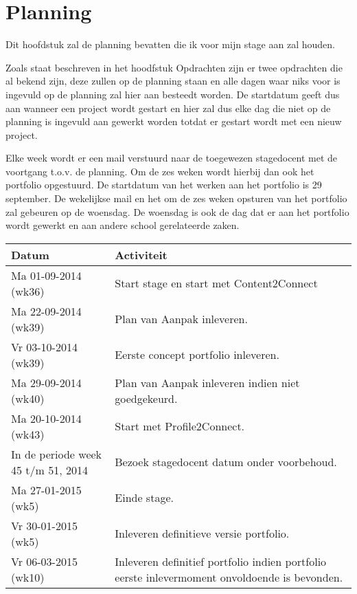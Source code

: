 \section{Planning}
Dit hoofdstuk zal de planning bevatten die ik voor mijn stage aan zal houden.

Zoals staat beschreven in het hoodfstuk Opdrachten zijn er twee opdrachten die al bekend zijn, deze zullen op de planning staan en alle dagen waar niks voor is ingevuld op de planning zal hier aan besteedt worden. De startdatum geeft dus aan wanneer een project wordt gestart en hier zal dus elke dag die niet op de planning is ingevuld aan gewerkt worden totdat er gestart wordt met een nieuw project.

Elke week wordt er een mail verstuurd naar de toegewezen stagedocent met de voortgang t.o.v. de planning. Om de zes weken wordt hierbij dan ook het portfolio opgestuurd. De startdatum van het werken aan het portfolio is 29 september. De wekelijkse mail en het om de zes weken opsturen van het portfolio zal gebeuren op de woensdag. De woensdag is ook de dag dat er aan het portfolio wordt gewerkt en aan andere school gerelateerde zaken.
\begin{tabu} to \textwidth { | X[l] | X[l] | }
\hline
Datum & Activiteit \\ \hline
Ma 01-09-2014 (wk36) & Start stage en start met Content2Connect \\
Ma 22-09-2014 (wk39) & Plan van Aanpak inleveren. \\
Vr 03-10-2014 (wk39) & Eerste concept portfolio inleveren. \\
Ma 29-09-2014 (wk40) & Plan van Aanpak inleveren indien niet goedgekeurd. \\
Ma 20-10-2014 (wk43) & Start met Profile2Connect. \\
In de periode week 45 t/m 51, 2014 & Bezoek stagedocent datum onder voorbehoud. \\
Ma 27-01-2015 (wk5) & Einde stage. \\
Vr 30-01-2015 (wk5) & Inleveren definitieve versie portfolio. \\
Vr 06-03-2015 (wk10) & Inleveren definitief portfolio indien portfolio eerste inlevermoment onvoldoende is bevonden. \\
\hline
\end{tabu}


